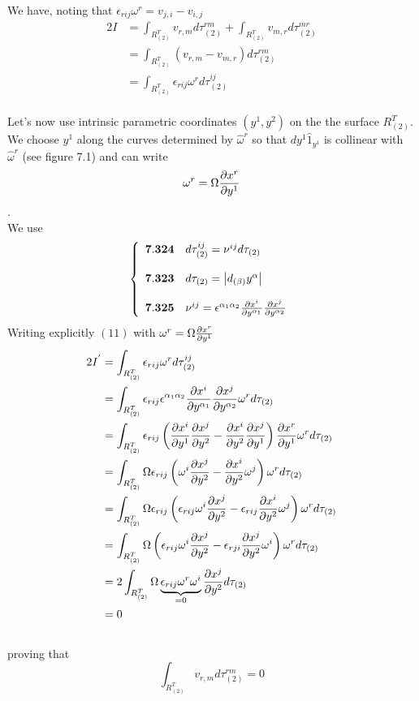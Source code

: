 We have, noting that $\epsilon_{rij}\omega^r = v_{j,i}- v_{i,j}$
\begin{align}
2I &= \int_{R^{T}_{(2)}}v_{r,m}d\tau_{(2)}^{rm}+\int_{R^{T}_{(2)}}v_{m,r}d\tau_{(2)}^{mr}\\
&= \int_{R^{T}_{(2)}}\left(v_{r,m}-v_{m,r}\right) d\tau_{(2)}^{rm}\\
&= \int_{R^{T}_{(2)}}\epsilon_{rij}\omega^r d\tau_{(2)}^{ij}
\end{align}\\
Let's now use intrinsic parametric coordinates $\left(y^1, y^2\right)$ on the the surface $R^{T}_{(2)}$. We choose $y^1$ along the curves determined by $\hat{\omega}^r$ so that $dy^1\hat{1}_{y^1}$ is collinear with $\hat{\omega}^r$ (see figure 7.1) and can write $$\omega^r = \Omega\pdv{x^r}{y^1}$$.\\
We use
\begin{align}
\left\{\begin{array}{ll}
\mathbf{7.324}&d\tau^{ij}_{(2)} = \nu^{ij}d\tau_{(2)}\\\\
\mathbf{7.323}&d\tau_{(2)} = \left|d_{(\beta)}y^{\alpha}\right|\\\\
\mathbf{7.325}&\nu^{ij}=\epsilon^{\alpha_1 \alpha_2}\pdv{x^i}{y^{\alpha_1}}\pdv{x^j}{y^{\alpha_2}}
\end{array}\right.
\end{align}
Writing explicitly $(11)$ with $\omega^{r}=\Omega\pdv{x^r}{y^1}$
\begin{align}
2I^{'} &= \int_{R^{T}_{(2)}}\epsilon_{rij}\omega^r d\tau_{(2)}^{ij}\\
&= \int_{R^{T}_{(2)}}\epsilon_{rij}\epsilon^{\alpha_1 \alpha_2}\pdv{x^i}{y^{\alpha_1}}\pdv{x^j}{y^{\alpha_2}}\omega^r d\tau_{(2)}\\
&= \int_{R^{T}_{(2)}} \epsilon_{rij}\left(\pdv{x^i}{y^{1}}\pdv{x^j}{y^{2}}-\pdv{x^i}{y^{2}}\pdv{x^j}{y^{1}}\right)\pdv{x^r}{y^1} \omega^rd\tau_{(2)}\\
&= \int_{R^{T}_{(2)}}\Omega \epsilon_{rij}\left(\omega^{i}\pdv{x^j}{y^{2}}-\pdv{x^i}{y^{2}}\omega^j\right)\omega^r d\tau_{(2)}\\
&= \int_{R^{T}_{(2)}}\Omega \epsilon_{rij}\left(\epsilon_{rij}\omega^{i}\pdv{x^j}{y^{2}}-\epsilon_{rij}\pdv{x^i}{y^{2}}\omega^j\right)\omega^r d\tau_{(2)}\\
&= \int_{R^{T}_{(2)}}\Omega \left(\epsilon_{rij}\omega^{i}\pdv{x^j}{y^{2}}-\epsilon_{rji}\pdv{x^j}{y^{2}}\omega^i\right)\omega^r d\tau_{(2)}\\
&= 2\int_{R^{T}_{(2)}}\Omega \underbrace{\epsilon_{rij}\omega^r\omega^{i}}_{=0}\pdv{x^j}{y^{2}} d\tau_{(2)}\\
&=0
\end{align}\\
proving that $$ \int_{R^{T}_{(2)}}v_{r,m}d\tau_{(2)}^{rm}=0$$

